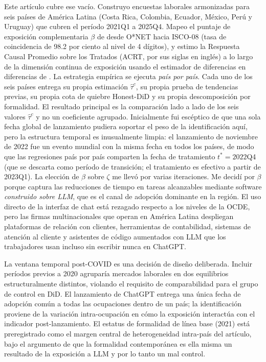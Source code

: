 Este art\'{i}culo cubre ese vac\'{i}o. Construyo encuestas laborales armonizadas para seis pa\'{i}ses de Am\'{e}rica Latina (Costa Rica, Colombia, Ecuador, M\'{e}xico, Per\'{u} y Uruguay) que cubren el per\'{i}odo 2021Q1 a 2025Q4. Mapeo el puntaje de exposici\'{o}n complementaria $\beta$ de \citet{Eloundou2023_gpt_exposure} desde O*NET hacia ISCO-08 (tasa de coincidencia de 98.2 por ciento al nivel de 4 d\'{i}gitos), y estimo la Respuesta Causal Promedio sobre los Tratados (ACRT, por sus siglas en ingl\'{e}s) a lo largo de la dimensi\'{o}n continua de exposici\'{o}n usando el estimador de diferencias en diferencias de \citet{CallawayCGBS2024_continuous}. La estrategia emp\'{i}rica se ejecuta \emph{pa\'{i}s por pa\'{i}s}. Cada uno de los seis pa\'{i}ses entrega su propia estimaci\'{o}n $\hat\tau^c$, su propia prueba de tendencias previas, su propia cota de quiebre Honest-DiD y su propia descomposici\'{o}n por formalidad. El resultado principal es la comparaci\'{o}n lado a lado de los seis valores $\hat\tau^c$ y no un coeficiente agrupado. Inicialmente fui esc\'{e}ptico de que una sola fecha global de lanzamiento pudiera soportar el peso de la identificaci\'{o}n aqu\'{i}, pero la estructura temporal es inusualmente limpia: el lanzamiento de noviembre de 2022 fue un evento mundial con la misma fecha en todos los pa\'{i}ses, de modo que las regresiones pa\'{i}s por pa\'{i}s comparten la fecha de tratamiento $t^* = 2022$Q4 (que se descarta como per\'{i}odo de transici\'{o}n; el tratamiento es efectivo a partir de 2023Q1). La elecci\'{o}n de $\beta$ sobre $\zeta$ me llev\'{o} por varias iteraciones. Me decid\'{i} por $\beta$ porque captura las reducciones de tiempo en tareas alcanzables mediante software \emph{construido sobre LLM}, que es el canal de adopci\'{o}n dominante en la regi\'{o}n. El uso directo de la interfaz de chat est\'{a} rezagado respecto a los niveles de la OCDE, pero las firmas multinacionales que operan en Am\'{e}rica Latina despliegan plataformas de relaci\'{o}n con clientes, herramientas de contabilidad, sistemas de atenci\'{o}n al cliente y asistentes de c\'{o}digo aumentados con LLM que los trabajadores usan incluso sin escribir nunca en ChatGPT.

La ventana temporal post-COVID es una decisi\'{o}n de dise\~{n}o deliberada. Incluir per\'{i}odos previos a 2020 agrupar\'{i}a mercados laborales en dos equilibrios estructuralmente distintos, violando el requisito de comparabilidad para el grupo de control en DiD. El lanzamiento de ChatGPT entrega una \'{u}nica fecha de adopci\'{o}n com\'{u}n a todas las ocupaciones dentro de un pa\'{i}s; la identificaci\'{o}n proviene de la variaci\'{o}n intra-ocupaci\'{o}n en c\'{o}mo la exposici\'{o}n interact\'{u}a con el indicador post-lanzamiento. El estatus de formalidad de l\'{i}nea base (2021) est\'{a} preregistrado como el margen central de heterogeneidad intra-pa\'{i}s del art\'{i}culo, bajo el argumento de que la formalidad contempor\'{a}nea es ella misma un resultado de la exposici\'{o}n a LLM y por lo tanto un mal control.

